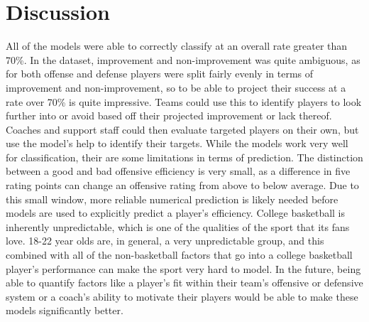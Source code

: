\documentclass[12pt]{article}
\begin{document}
\section{Discussion}
\label{sec:discussion}
All of the models were able to correctly classify at an overall rate greater than 70\%. In the dataset, improvement and non-improvement was quite ambiguous, as for both offense and defense players were split fairly evenly in terms of improvement and non-improvement, so to be able to project their success at a rate over 70\% is quite impressive. Teams could use this to identify players to look further into or avoid based off their projected improvement or lack thereof. Coaches and support staff could then evaluate targeted players on their own, but use the model's help to identify their targets. While the models work very well for classification, their are some limitations in terms of prediction. The distinction between a good and bad offensive efficiency is very small, as a difference in five rating points can change an offensive rating from above to below average. Due to this small window, more reliable numerical prediction is likely needed before models are used to explicitly predict a player's efficiency. College basketball is inherently unpredictable, which is one of the qualities of the sport that its fans love. 18-22 year olds are, in general, a very unpredictable group, and this combined with all of the non-basketball factors that go into a college basketball player's performance can make the sport very hard to model. In the future, being able to quantify factors like a player's fit within their team's offensive or defensive system or a coach's ability to motivate their players would be able to make these models significantly better.




\end{document}
